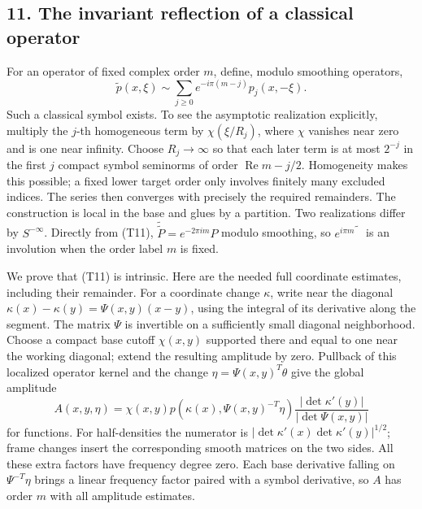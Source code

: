 \documentclass[
  11pt,
]{article}
\makeatletter
\let\ReaderOriginalAnchorStart\hyper@anchorstart
\let\ReaderOriginalAnchorEnd\hyper@anchorend
\let\ReaderPendingAliases\@empty
\def\ReaderArmAliases#1{\gdef\ReaderPendingAliases{#1}}
\def\hyper@anchorstart#1{\ReaderIfNativeAnchorTF{#1}{\ReaderPendingAliases\global\let\ReaderPendingAliases\@empty}{}\ReaderOriginalAnchorStart{#1}}
\makeatother
\begin{document}
\ReaderArmAliases{\ReaderOriginalAnchorStart{AN03-TR-004}\ReaderOriginalAnchorEnd\begingroup\expandafter\def\csname @currentHref\endcsname{AN03-TR-004}\label{AN03-TR-004}\endgroup\ReaderOriginalAnchorStart{an03-tr-004-the-invariant-reflection-of-a-classical-operator}\ReaderOriginalAnchorEnd\begingroup\expandafter\def\csname @currentHref\endcsname{an03-tr-004-the-invariant-reflection-of-a-classical-operator}\label{an03-tr-004-the-invariant-reflection-of-a-classical-operator}\endgroup\ReaderOriginalAnchorStart{11-the-invariant-reflection-of-a-classical-operator}\ReaderOriginalAnchorEnd\begingroup\expandafter\def\csname @currentHref\endcsname{11-the-invariant-reflection-of-a-classical-operator}\label{11-the-invariant-reflection-of-a-classical-operator}\endgroup\ReaderOriginalAnchorStart{the-invariant-reflection-of-a-classical-operator}\ReaderOriginalAnchorEnd}
\subsection{11. The invariant reflection of a classical
operator}\label{the-invariant-reflection-of-a-classical-operator}

For an operator of fixed complex order \(m\), define, modulo smoothing
operators, \[
\widetilde p(x,\xi)\sim
\sum_{j\geq0}e^{-i\pi(m-j)}p_j(x,-\xi).
\tag{T11}
\] Such a classical symbol exists. To see the asymptotic realization
explicitly, multiply the \(j\)-th homogeneous term by \(\chi(\xi/R_j)\),
where \(\chi\) vanishes near zero and is one near infinity. Choose
\(R_j\to\infty\) so that each later term is at most \(2^{-j}\) in the
first \(j\) compact symbol seminorms of order
\(\operatorname{Re}m-j/2\). Homogeneity makes this possible; a fixed
lower target order only involves finitely many excluded indices. The
series then converges with precisely the required remainders. The
construction is local in the base and glues by a partition. Two
realizations differ by \(S^{-\infty}\). Directly from (T11),
\(\widetilde{\widetilde P}=e^{-2\pi im}P\) modulo smoothing, so
\(e^{i\pi m}\widetilde{\phantom P}\) is an involution when the order
label \(m\) is fixed.

We prove that (T11) is intrinsic. Here are the needed full coordinate
estimates, including their remainder. For a coordinate change
\(\kappa\), write near the diagonal
\(\kappa(x)-\kappa(y)=\Psi(x,y)(x-y)\), using the integral of its
derivative along the segment. The matrix \(\Psi\) is invertible on a
sufficiently small diagonal neighborhood. Choose a compact base cutoff
\(\chi(x,y)\) supported there and equal to one near the working
diagonal; extend the resulting amplitude by zero. Pullback of this
localized operator kernel and the change \(\eta=\Psi(x,y)^T\theta\) give
the global amplitude \[
A(x,y,\eta)=\chi(x,y)p(\kappa(x),\Psi(x,y)^{-T}\eta)
\frac{|\det\kappa'(y)|}{|\det\Psi(x,y)|}
\tag{T12}
\] for functions. For half-densities the numerator is
\(|\det\kappa'(x)\det\kappa'(y)|^{1/2}\); frame changes insert the
corresponding smooth matrices on the two sides. All these extra factors
have frequency degree zero. Each base derivative falling on
\(\Psi^{-T}\eta\) brings a linear frequency factor paired with a symbol
derivative, so \(A\) has order \(m\) with all amplitude estimates.
\end{document}

